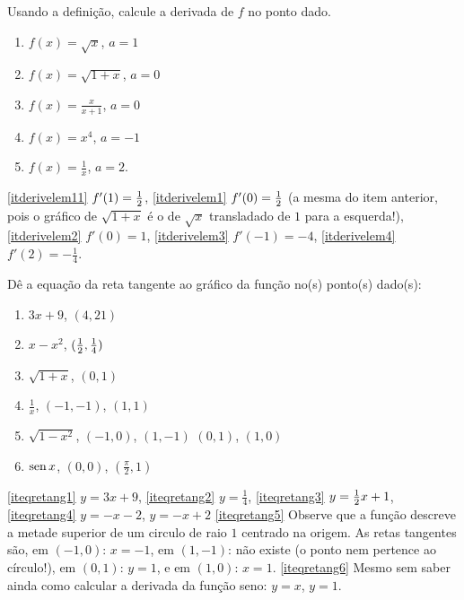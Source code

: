 \begin{exo}
Usando a {definição}, calcule a derivada de $f$ no ponto
dado.
\begin{multicols}{2}
\begin{enumerate}
\item\label{itderivelem11} $f(x)=\sqrt{x}$,  $a=1$
\item\label{itderivelem1} $f(x)=\sqrt{1+x}$, $a=0$
\item\label{itderivelem2} $f(x)=\frac{x}{x+1}$, $a=0$
\item\label{itderivelem3} $f(x)=x^4$, $a=-1$
\item\label{itderivelem4} $f(x)=\frac{1}{x}$, $a=2$.
\end{enumerate}
\end{multicols}
\vspace{0.01cm}
\begin{sol}
\eqref{itderivelem11} $f'(1)=\frac{1}{2}$,
\eqref{itderivelem1} $f'(0)=\frac{1}{2}$ (a mesma do item anterior, pois o
gráfico de $\sqrt{1+x}$ é o de $\sqrt{x}$ transladado de $1$ para a esquerda!),
\eqref{itderivelem2} $f'(0)=1$,
\eqref{itderivelem3} $f'(-1)=-4$,
\eqref{itderivelem4} $f'(2)=-\frac{1}{4}$.
\end{sol}
\end{exo}


\begin{exo}
Dê a equação da reta tangente ao gráfico da função no(s)
ponto(s) dado(s):
\begin{multicols}{2}
\begin{enumerate}
\item\label{iteqretang1} $3x+9$, $(4,21)$
\item\label{iteqretang2} $x-x^2$, $(\frac{1}{2},\frac{1}{4})$
\item\label{iteqretang3} $\sqrt{1+x}$, $(0,1)$
\item\label{iteqretang4} $\frac{1}{x}$, $(-1,-1)$, $(1,1)$
\item\label{iteqretang5} $\sqrt{1-x^2}$, $(-1,0)$, $(1,-1)$
$(0,1)$, $(1,0)$
\item\label{iteqretang6} $\operatorname{sen} x$, $(0,0)$, $(\frac{\pi}{2},1)$
\end{enumerate}
\end{multicols}
\vspace{0.01cm}
\begin{sol}
\eqref{iteqretang1} $y=3x+9$,
\eqref{iteqretang2} $y=\frac{1}{4}$,
\eqref{iteqretang3} $y=\frac{1}{2} x+1$,
\eqref{iteqretang4} $y=-x-2$, $y=-x+2$
\eqref{iteqretang5} Observe que a função descreve a metade superior de um
circulo de raio $1$ centrado na origem. As retas tangentes são, em $(-1,0)$:
$x=-1$, em $(1,-1)$: não existe (o ponto nem pertence ao círculo!), em $(0,1)$:
$y=1$, e em $(1,0)$: $x=1$.
\eqref{iteqretang6} Mesmo sem saber ainda como calcular a derivada da
função seno: $y=x$, $y=1$.
\end{sol}
\end{exo}

